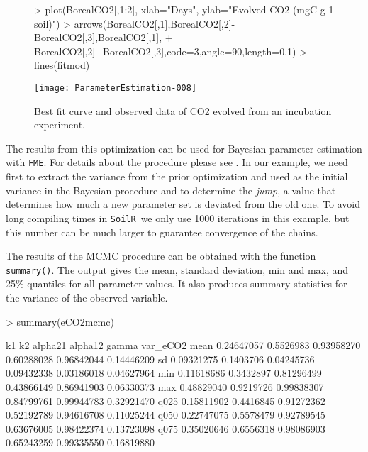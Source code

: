 \documentclass[a4paper]{article}
\newcommand{\SoilR}{\texttt{SoilR}}
\newcommand{\FME}{\texttt{FME}}
\begin{document}
\begin{figure}
  \centering
\begin{Schunk}
\begin{Sinput}
> plot(BorealCO2[,1:2], xlab="Days", ylab="Evolved CO2 (mgC g-1 soil)")
> arrows(BorealCO2[,1],BorealCO2[,2]-BorealCO2[,3],BorealCO2[,1],
+        BorealCO2[,2]+BorealCO2[,3],code=3,angle=90,length=0.1)
> lines(fitmod)
\end{Sinput}
\end{Schunk}
\texttt{[image: ParameterEstimation-008]}
  \caption{Best fit curve and observed data of CO2 evolved from an incubation experiment.}
  \label{fig:fit}
\end{figure}

The results from this optimization can be used for Bayesian parameter estimation with \FME. For details about the procedure please see \citet{Soetaert}. In our example, we need first to extract the variance from the prior optimization and used as the initial variance in the Bayesian procedure and to determine the {\it jump}, a value that determines how much a new parameter set is deviated from the old one. To avoid long compiling times in \SoilR \,  we only use 1000 iterations in this example, but this number can be much larger to guarantee convergence of the chains. 


The results of the MCMC procedure can be obtained with the function {\tt summary()}. The output gives the mean, standard deviation, min and max, and 25\% quantiles for all parameter values. It also produces summary statistics for the variance of the observed variable. 


\begin{Schunk}
\begin{Sinput}
> summary(eCO2mcmc)
\end{Sinput}
\begin{Soutput}
             k1        k2    alpha21    alpha12      gamma   var_eCO2
mean 0.24647057 0.5526983 0.93958270 0.60288028 0.96842044 0.14446209
sd   0.09321275 0.1403706 0.04245736 0.09432338 0.03186018 0.04627964
min  0.11618686 0.3432897 0.81296499 0.43866149 0.86941903 0.06330373
max  0.48829040 0.9219726 0.99838307 0.84799761 0.99944783 0.32921470
q025 0.15811902 0.4416845 0.91272362 0.52192789 0.94616708 0.11025244
q050 0.22747075 0.5578479 0.92789545 0.63676005 0.98422374 0.13723098
q075 0.35020646 0.6556318 0.98086903 0.65243259 0.99335550 0.16819880
\end{Soutput}
\end{Schunk}
\end{document}
